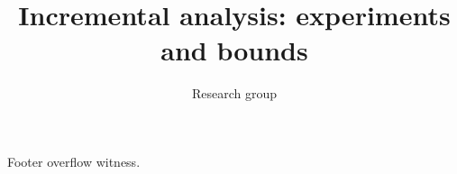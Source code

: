 \documentclass[12pt,aspectratio=43]{beamer}
\title{Incremental analysis: experiments and bounds}
\author{Research group}
\date{}
\begin{document}
\begin{frame}Footer overflow witness.\end{frame}
\end{document}
